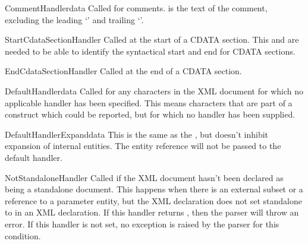 \begin{methoddesc}[xmlparser]{CommentHandler}{data}
Called for comments.   is the text of the comment, excluding
the leading `\code{<!-}\code{-}' and trailing `\code{-}\code{->}'.
\end{methoddesc}

\begin{methoddesc}[xmlparser]{StartCdataSectionHandler}{}
Called at the start of a CDATA section.  This and
 are needed to be able to identify
the syntactical start and end for CDATA sections.
\end{methoddesc}

\begin{methoddesc}[xmlparser]{EndCdataSectionHandler}{}
Called at the end of a CDATA section.
\end{methoddesc}

\begin{methoddesc}[xmlparser]{DefaultHandler}{data}
Called for any characters in the XML document for
which no applicable handler has been specified.  This means
characters that are part of a construct which could be reported, but
for which no handler has been supplied. 
\end{methoddesc}

\begin{methoddesc}[xmlparser]{DefaultHandlerExpand}{data}
This is the same as the , 
but doesn't inhibit expansion of internal entities.
The entity reference will not be passed to the default handler.
\end{methoddesc}

\begin{methoddesc}[xmlparser]{NotStandaloneHandler}{} Called if the
XML document hasn't been declared as being a standalone document.
This happens when there is an external subset or a reference to a
parameter entity, but the XML declaration does not set standalone to
 in an XML declaration.  If this handler returns ,
then the parser will throw an 
error.  If this handler is not set, no exception is raised by the
parser for this condition.
\end{methoddesc}


